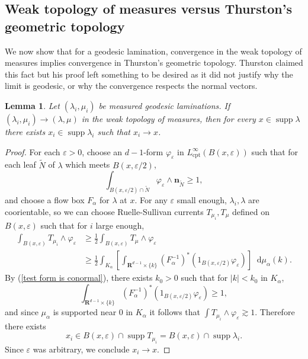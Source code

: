 \documentclass[reqno,10pt]{amsart}
\newcommand{\RR}{\mathbf{R}}
\newcommand*\dif{\mathop{}\!\mathrm{d}}
\DeclareMathOperator{\supp}{supp}
\newcommand{\normal}{\mathbf n}
\newcommand{\cpt}{\mathrm{cpt}}
\newtheorem{lemma}[theorem]{Lemma}
\theoremstyle{definition}
\numberwithin{equation}{section}
\begin{document}
\subsection{Weak topology of measures versus Thurston's geometric topology}
We now show that for a geodesic lamination, convergence in the weak topology of measures implies convergence in Thurston's geometric topology.
Thurston claimed this fact \cite[Proposition 8.10.3]{thurston1979geometry} but his proof left something to be desired as it did not justify why the limit is geodesic, or why the convergence respects the normal vectors.

\begin{lemma}
Let $(\lambda_i, \mu_i)$ be measured geodesic laminations.
If $(\lambda_i, \mu_i) \to (\lambda, \mu)$ in the weak topology of measures, then for every $x \in \supp \lambda$ there exists $x_i \in \supp \lambda_i$ such that $x_i \to x$.
\end{lemma}
\begin{proof}
For each $\varepsilon > 0$, choose an $d-1$-form $\varphi_\varepsilon$ in $L^\infty_\cpt(B(x, \varepsilon))$ such that for each leaf $\tilde N$ of $\lambda$ which meets $B(x, \varepsilon/2)$,
\begin{equation}\label{test form is conormal}
\int_{B(x, \varepsilon/2) \cap \tilde N} \varphi_\varepsilon \wedge \normal_{\tilde N} \geq 1,
\end{equation}
and choose a flow box $F_\alpha$ for $\lambda$ at $x$.
For any $\varepsilon$ small enough, $\lambda_i, \lambda$ are coorientable, so we can choose Ruelle-Sullivan currents $T_{\mu_i}, T_\mu$ defined on $B(x, \varepsilon)$ such that for $i$ large enough,
\begin{align*}
\int_{B(x, \varepsilon)} T_{\mu_i} \wedge \varphi_\varepsilon
&\geq \frac{1}{2} \int_{B(x, \varepsilon)} T_\mu \wedge \varphi_\varepsilon\\
&\geq \frac{1}{2} \int_{K_\alpha} \left[\int_{\RR^{d - 1} \times \{k\}} (F_\alpha^{-1})^* (1_{B(x, \varepsilon/2)} \varphi_\varepsilon)\right] \dif \mu_\alpha(k).
\end{align*}
By (\ref{test form is conormal}), there exists $k_0 > 0$ such that for $|k| < k_0$ in $K_\alpha$,
$$\int_{\RR^{d - 1} \times \{k\}} (F_\alpha^{-1})^* (1_{B(x, \varepsilon/2)} \varphi_\varepsilon) \geq 1,$$
and since $\mu_\alpha$ is supported near $0$ in $K_\alpha$ it follows that $\int T_{\mu_i} \wedge \varphi_\varepsilon \gtrsim 1$.
Therefore there exists
$$x_i \in B(x, \varepsilon) \cap \supp T_{\mu_i} = B(x, \varepsilon) \cap \supp \lambda_i.$$
Since $\varepsilon$ was arbitrary, we conclude $x_i \to x$.
\end{proof}
\end{document}

